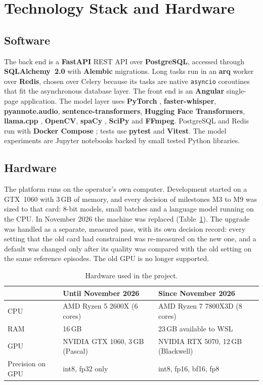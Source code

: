 \section{Technology Stack and Hardware}

\subsection*{Software}

The back end is a \textbf{FastAPI} \cite{fastapi_ref} REST API over \textbf{PostgreSQL}, accessed through \textbf{SQLAlchemy~2.0} \cite{sqlalchemy_ref} with \textbf{Alembic} migrations. Long tasks run in an \textbf{arq} \cite{arq_ref} worker over \textbf{Redis}, chosen over Celery because its tasks are native \texttt{asyncio} coroutines that fit the asynchronous database layer. The front end is an \textbf{Angular} \cite{angular_ref} single-page application. The model layer uses \textbf{PyTorch} \cite{paszke2019pytorch}, \textbf{faster-whisper}, \textbf{pyannote.audio}, \textbf{sentence-}\allowbreak\textbf{transformers}, \textbf{Hugging Face Transformers}, \textbf{llama.cpp} \cite{llamacpp}, \textbf{OpenCV}, \textbf{spaCy} \cite{spacy2020}, \textbf{SciPy} and \textbf{FFmpeg}. PostgreSQL and Redis run with \textbf{Docker Compose} \cite{merkel2014docker}; tests use \textbf{pytest} and \textbf{Vitest}. The model experiments are Jupyter notebooks backed by small tested Python libraries.

\subsection*{Hardware}

The platform runs on the operator's own computer. Development started on a GTX~1060 with 3\,GB of memory, and every decision of milestones M3 to M9 was sized to that card: 8-bit models, small batches and a language model running on the CPU. In November 2026 the machine was replaced (Table~\ref{tab:hardware}). The upgrade was handled as a separate, measured pass, with its own decision record: every setting that the old card had constrained was re-measured on the new one, and a default was changed only after its quality was compared with the old setting on the same reference episodes. The old GPU is no longer supported.

\begin{table}[H]
\centering
\caption{Hardware used in the project.}
\label{tab:hardware}
\small
\begin{tabular}{@{}lll@{}}
\toprule
& \textbf{Until November 2026} & \textbf{Since November 2026} \\
\midrule
CPU & AMD Ryzen 5 2600X (6 cores) & AMD Ryzen 7 7800X3D (8 cores) \\
RAM & 16\,GB & 23\,GB available to WSL \\
GPU & NVIDIA GTX 1060, 3\,GB (Pascal) & NVIDIA RTX 5070, 12\,GB (Blackwell) \\
Precision on GPU & int8, fp32 only & int8, fp16, bf16, fp8 \\
\bottomrule
\end{tabular}
\end{table}

